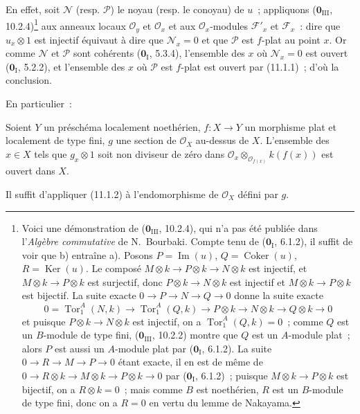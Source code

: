 En effet, soit $\mathcal N$ (resp. $\mathcal P$) le noyau (resp. le conoyau) de
$u$~; appliquons ($\mathbf 0_{\mathrm{III}}$, 10.2.4)\footnote{Voici une
démonstration de ($\mathbf 0_{\mathrm{III}}$, 10.2.4), qui n'a pas été publiée
dans l'\emph{Algèbre commutative} de N.~Bourbaki. Compte tenu de
($\mathbf 0_{\mathrm I}$, 6.1.2), il suffit de voir que b) entraîne a). Posons
$P=\operatorname{Im}(u)$, $Q=\operatorname{Coker}(u)$,
$R=\operatorname{Ker}(u)$. Le composé
$M\otimes k\to P\otimes k\to N\otimes k$ est injectif, et
$M\otimes k\to P\otimes k$ est surjectif, donc
$P\otimes k\to N\otimes k$ est injectif et
$M\otimes k\to P\otimes k$ est bijectif. La suite exacte
$0\to P\to N\to Q\to0$ donne la suite exacte
\[
0=\operatorname{Tor}_1^A(N,k)\to\operatorname{Tor}_1^A(Q,k)
\to P\otimes k\to N\otimes k\to Q\otimes k\to0
\]
et puisque $P\otimes k\to N\otimes k$ est injectif, on a
$\operatorname{Tor}_1^A(Q,k)=0$~; comme $Q$ est un $B$-module de type fini,
($\mathbf 0_{\mathrm{III}}$, 10.2.2) montre que $Q$ est un $A$-module plat~;
alors $P$ est aussi un $A$-module plat par ($\mathbf 0_{\mathrm I}$, 6.1.2).
La suite $0\to R\to M\to P\to0$ étant exacte, il en est de même de
$0\to R\otimes k\to M\otimes k\to P\otimes k\to0$ par
($\mathbf 0_{\mathrm I}$, 6.1.2)~; puisque $M\otimes k\to P\otimes k$ est
bijectif, on a $R\otimes k=0$~; mais comme $B$ est noethérien, $R$ est un
$B$-module de type fini, donc on a $R=0$ en vertu du lemme de Nakayama.} aux
anneaux locaux $\mathcal O_y$ et $\mathcal O_x$ et aux
$\mathcal O_x$-modules $\mathcal F'_x$ et $\mathcal F_x$~: dire que
$u_x\otimes1$ est injectif équivaut à dire que $\mathcal N_x=0$ et que
$\mathcal P$ est $f$-plat au point $x$. Or comme $\mathcal N$ et $\mathcal P$
sont cohérents ($\mathbf 0_{\mathrm I}$, 5.3.4), l'ensemble des $x$ où
$\mathcal N_x=0$ est ouvert ($\mathbf 0_{\mathrm I}$, 5.2.2), et l'ensemble
des $x$ où $\mathcal P$ est $f$-plat est ouvert par (11.1.1)~; d'où la
conclusion.

En particulier~:

\begin{corollary}[11.1.3]
\label{IV.11.1.3-fr}
Soient $Y$ un préschéma localement noethérien, $f:X\to Y$ un morphisme plat et
localement de type fini, $g$ une section de $\mathcal O_X$ au-dessus de $X$.
L'ensemble des $x\in X$ tels que $g_x\otimes1$ soit non diviseur de zéro dans
$\mathcal O_x\otimes_{\mathcal O_{f(x)}}k(f(x))$ est ouvert dans $X$.
\end{corollary}

Il suffit d'appliquer (11.1.2) à l'endomorphisme de $\mathcal O_X$ défini par
$g$.


